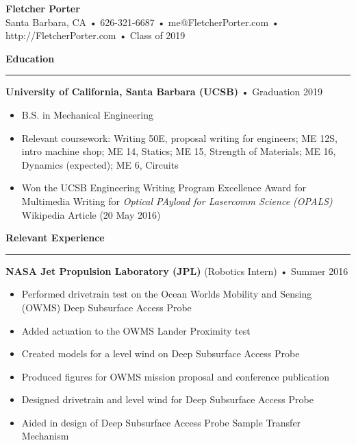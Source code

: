 \documentclass[12pt, oneside]{article}
\newcommand{\titlestyle}[1] {
	{\fontsize{50pt}{1em}\selectfont \bf \textcolor{new_red}{#1}} \\
}
\newcommand{\headingstyleJobs}[1] {
	{\fontsize{20pt}{1em}\selectfont \bf \textcolor{new_red}{#1}}
	\textcolor{new_red}{\rule{3.25in}{0.5pt}} \vspace{3pt}
}
\newcommand{\infostyle}[1] {
	{\fontsize{9pt}{1em}\selectfont #1} \\ \vspace{10pt}
}
\newcommand{\jobtitle}[3] {
	{\bf #1} {#2} • {#3} \vspace{-10pt} \\
}
\begin{document}
\begin{flushleft}


\titlestyle{Fletcher Porter}
\infostyle{Santa Barbara, CA • 626-321-6687 • me@FletcherPorter.com • http://FletcherPorter.com • Class of 2019}


\headingstyleJobs{Education}


\jobtitle{University of California, Santa Barbara (UCSB)}{}{Graduation 2019}
\begin{itemize}
	\item B.S. in Mechanical Engineering
	\item Relevant coursework: Writing 50E, proposal writing for engineers; ME 12S, intro machine shop; ME 14, Statics; ME 15, Strength of Materials; ME 16, Dynamics (expected); ME 6, Circuits
	\item Won the UCSB Engineering Writing Program Excellence Award for Multimedia Writing for \textit{Optical PAyload for Lasercomm Science (OPALS)} Wikipedia Article (20 May 2016)
\end{itemize}


\headingstyleJobs{Relevant Experience}

\jobtitle{NASA Jet Propulsion Laboratory (JPL)}{(Robotics Intern)}{Summer 2016}
\begin{itemize}
	\item Performed drivetrain test on the Ocean Worlds Mobility and Sensing (OWMS) Deep Subsurface Access Probe
	\item Added actuation to the OWMS Lander Proximity test
	\item Created models for a level wind on Deep Subsurface Access Probe
	\item Produced figures for OWMS mission proposal and conference publication
	\item Designed drivetrain and level wind for Deep Subsurface Access Probe
	\item Aided in design of Deep Subsurface Access Probe Sample Transfer Mechanism
\end{itemize}


\end{flushleft}
\end{document}
